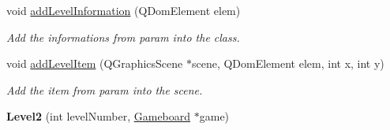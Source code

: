 \begin{DoxyCompactItemize}
void \hyperlink{class_level2_a6c6c7c86949a63afde397fdd7c76b01c}{add\+Level\+Information} (Q\+Dom\+Element elem)
\begin{DoxyCompactList}\small\item\em Add the informations from param into the class. \end{DoxyCompactList}\item 
void \hyperlink{class_level2_a87a8120e0107e8d7029480ff0e473b05}{add\+Level\+Item} (Q\+Graphics\+Scene $\ast$scene, Q\+Dom\+Element elem, int x, int y)
\begin{DoxyCompactList}\small\item\em Add the item from param into the scene. \end{DoxyCompactList}\item 
\hypertarget{class_level2_a245cab1175dfdb4b3561a7317e05ebd1}{}{\bfseries Level2} (int level\+Number, \hyperlink{class_gameboard}{Gameboard} $\ast$game)\label{class_level2_a245cab1175dfdb4b3561a7317e05ebd1}


\end{DoxyCompactItemize}
